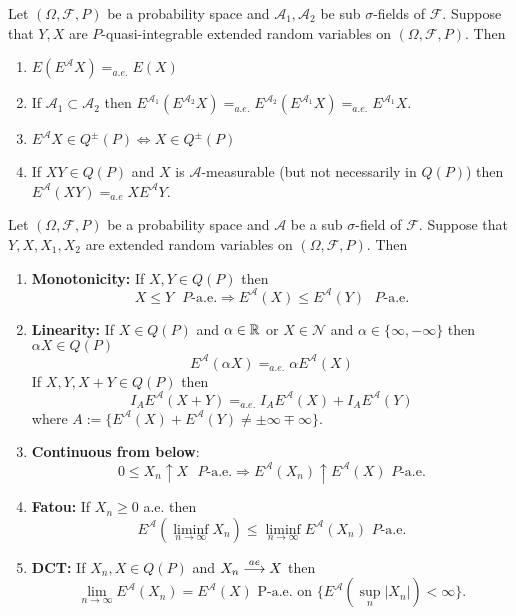 \begin{theorem}
Let $(\Omega, \mathcal F, P)$ be a probability space and $\mathcal A_1, \mathcal A_2$ be sub $\sigma$-fields of $\mathcal F$. Suppose that $Y, X$ are $P$-quasi-integrable extended random variables on $(\Omega, \mathcal F, P)$.
Then
\begin{enumerate}
\item ${E(E^{\mathcal A}X) =_{a.e.} E(X)}$
\item If $\mathcal A_1\subset \mathcal A_2$ then $E^{\mathcal A_1}(E^{\mathcal A_2}X) =_{a.e.} E^{\mathcal A_2}(E^{\mathcal A_1}X) =_{a.e.} E^{\mathcal A_1}X$.
\item $E^{\mathcal A}X\in Q^{\pm}(P) \Longleftrightarrow X\in Q^\pm(P)$
\item If $XY\in Q(P)$ and  $X$ is $\mathcal A$-measurable (but not necessarily in $Q(P)$) then $E^{\mathcal A}(XY) =_{a.e} X E^{\mathcal A}Y$.
\end{enumerate}
\end{theorem}


\begin{theorem} Let $(\Omega, \mathcal F, P)$ be a probability space and $\mathcal A$ be a sub $\sigma$-field of $\mathcal F$.
Suppose that $Y, X, X_1, X_2$ are extended random variables on $(\Omega, \mathcal F, P)$.
Then
\begin{enumerate}
\item {\bf Monotonicity:} If $X,Y \in Q(P)$ then
\[
{\text{$X\leq Y$ $P$-a.e.}\Longrightarrow \text{$E^{\mathcal A} (X) \leq E^{\mathcal A} (Y)$ $P$-a.e.}}  \]
\item {\bf Linearity:}
If $X\in Q(P)$ and $\alpha \in \Bbb R$ or $X\in \mathscr N$ and $\alpha\in\{\infty, -\infty \}$ then $\alpha X\in Q(P)$
\[
E^{\mathcal A} (\alpha X) =_{a.e.}  \alpha E^{\mathcal A} (X)
\]
If $X, Y, X+Y\in Q(P)$ then
\[
I_A E^{\mathcal A} (X +  Y) =_{a.e.}  I_A E^{\mathcal A} (X) + I_A E^{\mathcal A} (Y)
\]
where $A:=\{E^{\mathcal A} (X) + E^{\mathcal A} (Y)\neq \pm \infty \mp\infty\}$.
\item {\bf Continuous from below}:
\[
{\text{$0\leq X_n\uparrow X$ $P$-a.e.}\Longrightarrow E^{\mathcal A} (X_n) \uparrow E^{\mathcal A} (X)\,\, \text{$P$-a.e.} }
 \]
\item {\bf Fatou:} If  $X_n\geq 0$ a.e. then
\[
{
E^{\mathcal A}( \liminf_{n\rightarrow \infty} X_n ) \leq \liminf_{n\rightarrow \infty} E^{\mathcal A}(X_n)\,\, \text{$P$-a.e.}
}
\]
\item {\bf DCT:} If $X_n, X\in Q(P)$ and  $X_n\overset{\small ae} \longrightarrow X$ then
\[
{
\lim_{n\rightarrow \infty} E^{\mathcal A}(X_n) = E^{\mathcal A}(X) \,\, \text{P-a.e. on  $\{E^{\mathcal A}(\sup_n |X_n|)<\infty \}$}.
}
\]
\end{enumerate}
\end{theorem}



